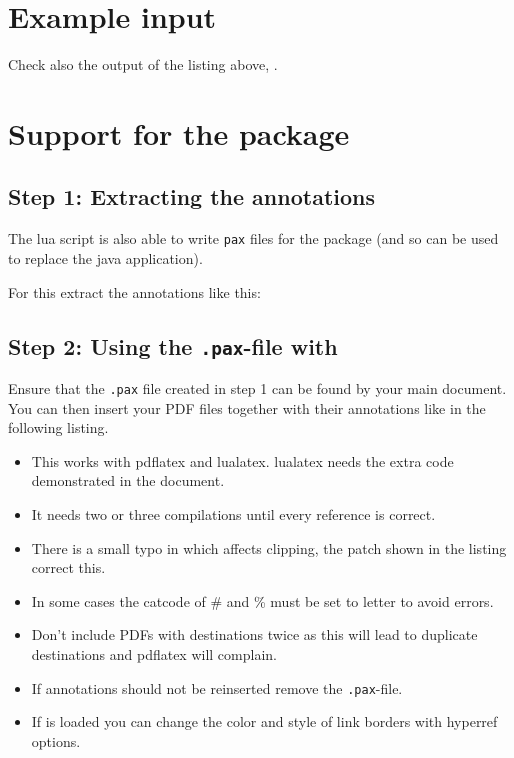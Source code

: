 \documentclass[DIV=12,parskip=half-,bibliography=totoc]{scrartcl}
\begin{document}
\section{Example input}


Check also the output of the listing above, .

\section{Support for the \texorpdfstring{}{pax} package}

\subsection{Step 1: Extracting the annotations}
The lua script is also able to write \texttt{pax} files for the  package (and so can be used to replace the java application).

For this extract the annotations like this:



\subsection{Step 2: Using the \texttt{.pax}-file with }

Ensure that the \texttt{.pax} file created in step 1 can be found by your main document. You can then insert your PDF files together with their annotations like in the following listing.

\begin{itemize}
\item This works with pdflatex and lualatex. lualatex needs the extra code demonstrated in the document.
\item It needs two or three compilations until every reference is correct.
\item There is a small typo in  which affects clipping, the patch shown in the listing correct this.
\item In some cases the catcode of \# and \% must be set to letter to avoid errors. 
\item Don't include PDFs with destinations twice as this will lead to duplicate destinations and pdflatex will complain.
\item If annotations should not be reinserted remove the \texttt{.pax}-file.
\item If  is loaded you can change the color and style of link borders with hyperref options.
\end{itemize}
\enlargethispage{\baselineskip}

\end{document}

